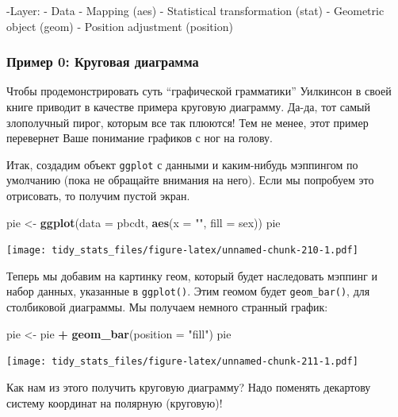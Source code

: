\documentclass[]{book}
\newenvironment{Shaded}{\begin{snugshade}}{\end{snugshade}}
\newcommand{\KeywordTok}[1]{\textcolor[rgb]{0.13,0.29,0.53}{\textbf{#1}}}
\newcommand{\DataTypeTok}[1]{\textcolor[rgb]{0.13,0.29,0.53}{#1}}
\newcommand{\StringTok}[1]{\textcolor[rgb]{0.31,0.60,0.02}{#1}}
\newcommand{\OperatorTok}[1]{\textcolor[rgb]{0.81,0.36,0.00}{\textbf{#1}}}
\newcommand{\NormalTok}[1]{#1}
\begin{document}
-Layer: - Data - Mapping (aes) - Statistical transformation (stat) -
Geometric object (geom) - Position adjustment (position)

\subsubsection{Пример 0: Круговая
диаграмма}\label{ux43fux440ux438ux43cux435ux440-0-ux43aux440ux443ux433ux43eux432ux430ux44f-ux434ux438ux430ux433ux440ux430ux43cux43cux430}

Чтобы продемонстрировать суть ``графической грамматики'' Уилкинсон в
своей книге приводит в качестве примера круговую диаграмму. Да-да, тот
самый злополучный пирог, которым все так плюются! Тем не менее, этот
пример перевернет Ваше понимание графиков с ног на голову.

Итак, создадим объект \texttt{ggplot} с данными и каким-нибудь мэппингом
по умолчанию (пока не обращайте внимания на него). Если мы попробуем это
отрисовать, то получим пустой экран.

\begin{Shaded}
\begin{Highlighting}[]
\NormalTok{pie <-}\StringTok{ }\KeywordTok{ggplot}\NormalTok{(}\DataTypeTok{data =}\NormalTok{ pbcdt, }\KeywordTok{aes}\NormalTok{(}\DataTypeTok{x =} \StringTok{""}\NormalTok{, }\DataTypeTok{fill =}\NormalTok{ sex))}
\NormalTok{pie}
\end{Highlighting}
\end{Shaded}

\texttt{[image: tidy\_stats\_files/figure-latex/unnamed-chunk-210-1.pdf]}

Теперь мы добавим на картинку геом, который будет наследовать мэппинг и
набор данных, указанные в \texttt{ggplot()}. Этим геомом будет
\texttt{geom\_bar()}, для столбиковой диаграммы. Мы получаем немного
странный график:

\begin{Shaded}
\begin{Highlighting}[]
\NormalTok{pie <-}\StringTok{ }\NormalTok{pie }\OperatorTok{+}
\StringTok{  }\KeywordTok{geom_bar}\NormalTok{(}\DataTypeTok{position =} \StringTok{"fill"}\NormalTok{)}
\NormalTok{pie}
\end{Highlighting}
\end{Shaded}

\texttt{[image: tidy\_stats\_files/figure-latex/unnamed-chunk-211-1.pdf]}

Как нам из этого получить круговую диаграмму? Надо поменять декартову
систему координат на полярную (круговую)!
\end{document}
